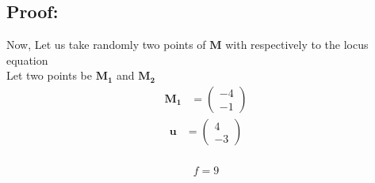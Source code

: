 \documentclass[10pt,a4paper]{report}
\newcommand{\myvec}[1]{\ensuremath{\begin{pmatrix}#1\end{pmatrix}}}
\let\vec\mathbf
\begin{document}
\begin{multicols}{2}
\section*{Proof:}
Now, Let us take randomly two points of $\vec{M}$ with respectively to the locus equation
\vspace{0.25cm}\\
Let two points be $\vec{M_1}$ and $\vec{M_2}$
\vspace{0.25cm}\\
\begin{align} 
\vec{M_1} &= \myvec{-4 \\ -1} 
\end{align}
\begin{align} 
\vec{u} &= \myvec{4 \\ -3} 
\end{align}
\\
\begin{align}
f=9
\end{align}


\end{multicols}
\end{document}
